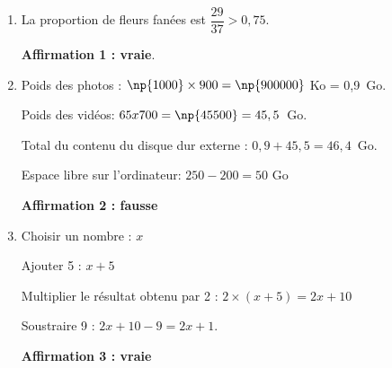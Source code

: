 
\medskip

\begin{enumerate}
\item La proportion de fleurs fanées est $\dfrac{29}{37} > 0,75$. 

\textbf{Affirmation 1 : vraie}.
\item  Poids des photos : $\np{1000} \times 900 = \np{900000}$ Ko = 0,9~Go.

Poids des vidéos: $65 x 700 = \np{45500} = 45,5$~Go.

Total du contenu du disque dur externe : $0,9 + 45,5 = 46,4$~Go.

Espace libre sur l'ordinateur: $250 - 200 = 50$ Go

\textbf{Affirmation 2 : fausse}
\item  Choisir un nombre : $x$

Ajouter 5 : $x + 5$

Multiplier le résultat obtenu par 2 : $2 \times (x + 5) = 2x + 10$

Soustraire 9 : $2x + 10 - 9 = 2x + 1$.

\textbf{Affirmation 3 : vraie}
\end{enumerate}

\medskip


\vspace{0,5cm}

